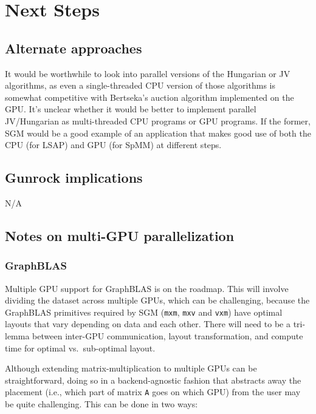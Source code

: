 \documentclass[10pt,oneside]{memoir}
\begin{document}
\hypertarget{next-steps-7}{%
\section{Next Steps}\label{next-steps-7}}

\hypertarget{alternate-approaches-6}{%
\subsection{Alternate approaches}\label{alternate-approaches-6}}

It would be worthwhile to look into parallel versions of the Hungarian
or JV algorithms, as even a single-threaded CPU version of those
algorithms is somewhat competitive with Bertseka's auction algorithm
implemented on the GPU. It's unclear whether it would be better to
implement parallel JV/Hungarian as multi-threaded CPU programs or GPU
programs. If the former, SGM would be a good example of an application
that makes good use of both the CPU (for LSAP) and GPU (for SpMM) at
different steps.

\hypertarget{gunrock-implications-6}{%
\subsection{Gunrock implications}\label{gunrock-implications-6}}

N/A

\hypertarget{notes-on-multi-gpu-parallelization-7}{%
\subsection{Notes on multi-GPU
parallelization}\label{notes-on-multi-gpu-parallelization-7}}

\hypertarget{graphblas-4}{%
\subsubsection{GraphBLAS}\label{graphblas-4}}

Multiple GPU support for GraphBLAS is on the roadmap. This will involve
dividing the dataset across multiple GPUs, which can be challenging,
because the GraphBLAS primitives required by SGM (\texttt{mxm},
\texttt{mxv} and \texttt{vxm}) have optimal layouts that vary depending
on data and each other. There will need to be a tri-lemma between
inter-GPU communication, layout transformation, and compute time for
optimal vs.~sub-optimal layout.

Although extending matrix-multiplication to multiple GPUs can be
straightforward, doing so in a backend-agnostic fashion that abstracts
away the placement (i.e., which part of matrix \texttt{A} goes on which
GPU) from the user may be quite challenging. This can be done in two
ways:
\end{document}
